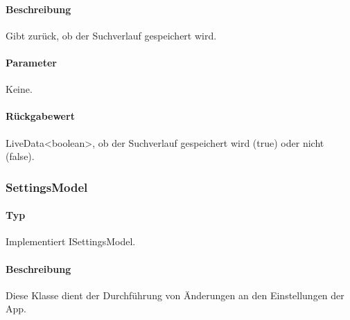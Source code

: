 \paragraph*{Beschreibung}
Gibt zurück, ob der Suchverlauf gespeichert wird.
\paragraph*{Parameter}
Keine.
\paragraph*{Rückgabewert}
LiveData<boolean>, ob der Suchverlauf gespeichert wird (true) oder nicht (false).

\subsubsection{SettingsModel}
\paragraph*{Typ}
Implementiert ISettingsModel.
\paragraph*{Beschreibung}
Diese Klasse dient der Durchführung von Änderungen an den Einstellungen der App.
